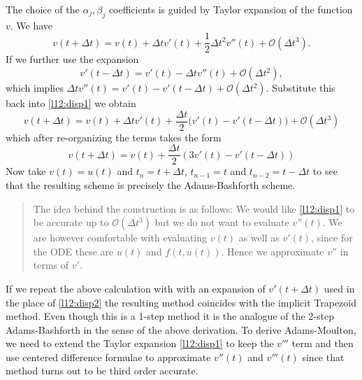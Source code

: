 The choice of the $\alpha_j, \beta_j$ coefficients 
is guided by Taylor expansion of the function $v$. 
We have   
\begin{equation}\label{l12:disp1}
        v(t + \Delta t) = v(t) + \Delta t v'(t) 
        + \frac{1}{2} \Delta t^2 v''(t) + \mathcal{O}(\Delta t^3).
\end{equation}
If we further use the expansion 
\begin{equation}\label{l12:disp2}
    v'(t - \Delta t) = v'(t) - \Delta t v''(t) + \mathcal{O}(\Delta t^2),
\end{equation}
which implies $ \Delta t v''(t) = v'(t) - v'(t - \Delta t) 
+ \mathcal{O}(\Delta t^2)$. 
Substitute this  back into \eqref{l12:disp1} we obtain 
\begin{equation*}
    v(t + \Delta t) = v(t) + 
    \Delta t v'(t) + \frac{\Delta t}{2} \Big( v'(t) - 
    v'(t - \Delta t)\Big)
    + \mathcal{O}(\Delta t^3)
\end{equation*}
which after re-organizing the terms takes the form 
\begin{equation*}
    v(t + \Delta t) = v(t) + \frac{\Delta t}{2} \left( 3 v'(t) - v'(t - \Delta t) 
    \right)
\end{equation*}
Now take $v(t) = u(t)$ and $t_n = t + \Delta t$, $t_{n-1} = t$ and 
$t_{n-2} = t - \Delta t$ to see that the resulting scheme is precisely 
the Adams-Bashforth scheme.

\begin{quote}
    The idea behind the construction is as follows: We would like 
    \eqref{l12:disp1} to be accurate up to $\mathcal{O}(\Delta t^3)$ but 
    we do not want to evaluate $v''(t)$. We are however comfortable 
    with evaluating $v(t)$ as well as $v'(t)$, since for the 
    ODE these are $u(t)$ and $f(t, u(t))$. Hence we approximate 
    $v''$ in terms of $v'$. 
\end{quote}

If we repeat the above calculation with  
with an expansion of $v'(t + \Delta t)$ used in the place of 
\eqref{l12:disp2} the resulting method 
coincides with the implicit Trapezoid method. Even though 
this is a 1-step method it is the analogue of the 2-step 
Adams-Bashforth in the sense of the above derivation.
To derive Adams-Moulton, we need to extend the Taylor 
expansion \eqref{l12:disp1} to keep the $v'''$ term and 
then use centered difference formulae to approximate $v''(t)$ 
and $v'''(t)$ since that method turns out to be third order accurate.


